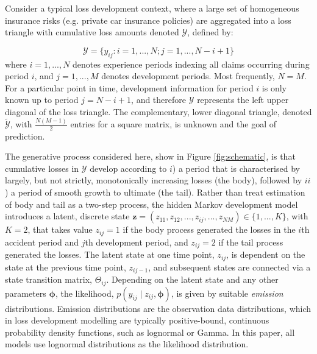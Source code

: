 Consider a typical loss development context, where
a large set of homogeneous insurance risks (e.g. private
car insurance policies) are aggregated
into a loss triangle with
cumulative loss amounts denoted
$\mathcal{Y}$, defined by:

\begin{equation}
	\mathcal{Y} = \{y_{ij} : i = 1, ..., N; j = 1, ..., N - i + 1\}
\end{equation}
%
where $i = 1, ..., N$ denotes experience periods 
indexing all claims occurring during period $i$, and $j = 1, ..., M$
denotes development periods. 
Most frequently, $N = M$.
For a particular point in time,
development information for period $i$ is only known up to period 
$j = N - i + 1$,
and therefore $\mathcal{Y}$ represents the left upper diagonal of
the loss triangle. The complementary, lower diagonal 
triangle, denoted $\tilde{\mathcal{Y}}$,
with $\frac{N (M - 1)}{2}$ entries 
for a square matrix,
is unknown and the goal of prediction.

The generative process considered here, show in
Figure \ref{fig:schematic},
is that cumulative losses
in $\mathcal{Y}$ develop according to $i$) a period that is
characterised by largely, but not strictly, monotonically 
increasing losses 
(the body), followed by $ii$) a period of smooth
growth to ultimate (the tail). Rather than
treat estimation of body and tail as a two-step process,
the hidden Markov development model introduces a
latent, discrete state $\bm{z} = (z_{11}, z_{12}, ..., z_{ij}, ..., z_{NM})
\in \{1, ...,  K\}$, with $K = 2$, that takes value
$z_{ij} = 1$ if the body process generated the losses in the $i$th
accident period and $j$th development period, and
$z_{ij} = 2$ if the tail process generated the losses.
The latent state at one time point, $z_{ij}$, is dependent
on the state at the previous time point, $z_{ij-1}$,
and subsequent states are connected via a state transition
matrix, $\Theta_{ij}$.
Depending on the latent state and any other parameters
$\bm{\phi}$, the likelihood, $p(y_{ij} \mid z_{ij}, \bm{\phi})$,
is given by suitable \textit{emission} distributions.
Emission distributions are the observation data distributions,
which in loss development modelling are typically
positive-bound, continuous probability density
functions, such as lognormal or Gamma.
In this paper, all models use lognormal distributions
as the likelihood distribution.

